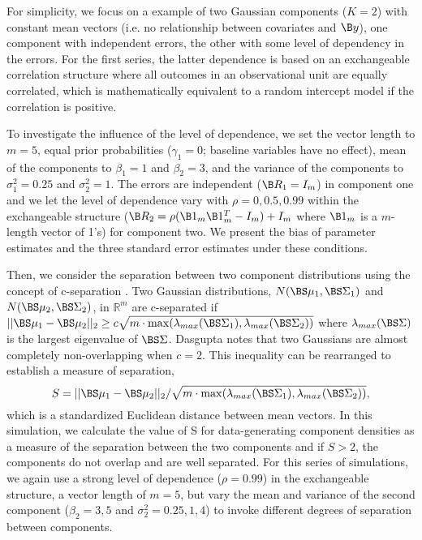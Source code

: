  For simplicity, we focus on a example of two Gaussian components ($K = 2$) with constant mean vectors (i.e. no relationship between covariates and $\B y$), one component with independent errors, the other with some level of dependency in the errors. For the first series, the latter dependence is based on an exchangeable correlation structure where all outcomes in an observational unit are equally correlated, which is mathematically equivalent to a random intercept model if the correlation is positive.
 
To investigate the influence of the level of dependence, we set the vector length to $m=5$, equal prior probabilities ($\gamma_{1}=0$; baseline variables have no effect), mean of the components to $\beta_{1}=1$ and $\beta_{2}=3$, and the variance of the components to $\sigma^{2}_{1}=0.25$ and $\sigma^{2}_{2}=1$. The errors are independent ($\B R_{1}=I_{m}$) in component one and we let the level of dependence vary with $\rho=0,0.5,0.99$ within the exchangeable structure ($\B R_2 = \rho(\B 1_m\B 1_{m}^{T}-I_m)+I_m$ where $\B 1_m$ is a $m$-length vector of 1's) for component two. We present the bias of parameter estimates and the three standard error estimates under these conditions.

Then, we consider the separation between two component distributions using the concept of c-separation \cite{dasgupta1999}. Two Gaussian distributions, $N(\BS\mu_{1},\BS\Sigma_{1})$ and $N(\BS\mu_{2},\BS\Sigma_{2})$, in $\mathbb{R}^{m}$ are c-separated if $||\BS\mu_{1}-\BS\mu_{2}||_{2}\geq c\sqrt{m\cdot\max(\lambda_{max}(\BS\Sigma_{1}),\lambda_{max}(\BS\Sigma_{2}))}$
where $\lambda_{max}(\BS\Sigma)$ is the largest eigenvalue of $\BS\Sigma$.  Dasgupta \cite{dasgupta1999} notes that two Gaussians are almost completely non-overlapping when $c=2$. This inequality can be rearranged to establish a measure of separation,
$$S = ||\BS\mu_{1}-\BS\mu_{2}||_{2}/\sqrt{m\cdot\max(\lambda_{max}(\BS\Sigma_{1}),\lambda_{max}(\BS\Sigma_{2}))},$$
which is a standardized Euclidean distance between mean vectors. In this simulation, we calculate the value of S for data-generating component densities as a measure of the separation between the two components and if $S>2$, the components do not overlap and are well separated. For this series of simulations, we again use a strong level of dependence ($\rho=0.99$) in the exchangeable structure, a vector length of $m=5$, but vary the mean and variance of the second component ($\beta_{2}=3,5$ and $\sigma_{2}^{2}=0.25,1,4$) to invoke different degrees of separation between components.

